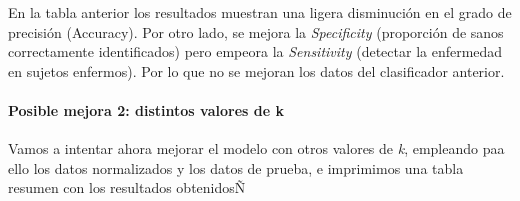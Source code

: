 \documentclass[
]{article}
\newenvironment{Shaded}{\begin{snugshade}}{\end{snugshade}}
\newcommand{\ControlFlowTok}[1]{\textcolor[rgb]{0.13,0.29,0.53}{\textbf{#1}}}
\newcommand{\DataTypeTok}[1]{\textcolor[rgb]{0.13,0.29,0.53}{#1}}
\newcommand{\DecValTok}[1]{\textcolor[rgb]{0.00,0.00,0.81}{#1}}
\newcommand{\KeywordTok}[1]{\textcolor[rgb]{0.13,0.29,0.53}{\textbf{#1}}}
\newcommand{\NormalTok}[1]{#1}
\newcommand{\OperatorTok}[1]{\textcolor[rgb]{0.81,0.36,0.00}{\textbf{#1}}}
\newcommand{\OtherTok}[1]{\textcolor[rgb]{0.56,0.35,0.01}{#1}}
\newcommand{\StringTok}[1]{\textcolor[rgb]{0.31,0.60,0.02}{#1}}
\let\oldparagraph\paragraph
\renewcommand{\paragraph}[1]{\oldparagraph{#1}\mbox{}}
\begin{document}
En la tabla anterior los resultados muestran una ligera disminución en
el grado de precisión (Accuracy). Por otro lado, se mejora la
\emph{Specificity} (proporción de sanos correctamente identificados)
pero empeora la \emph{Sensitivity} (detectar la enfermedad en sujetos
enfermos). Por lo que no se mejoran los datos del clasificador anterior.

\hypertarget{posible-mejora-2-distintos-valores-de-k}{%
\paragraph{Posible mejora 2: distintos valores de
k}\label{posible-mejora-2-distintos-valores-de-k}}

Vamos a intentar ahora mejorar el modelo con otros valores de \emph{k},
empleando paa ello los datos normalizados y los datos de prueba, e
imprimimos una tabla resumen con los resultados obtenidosÑ

\begin{Shaded}
\end{Shaded}
\end{document}
